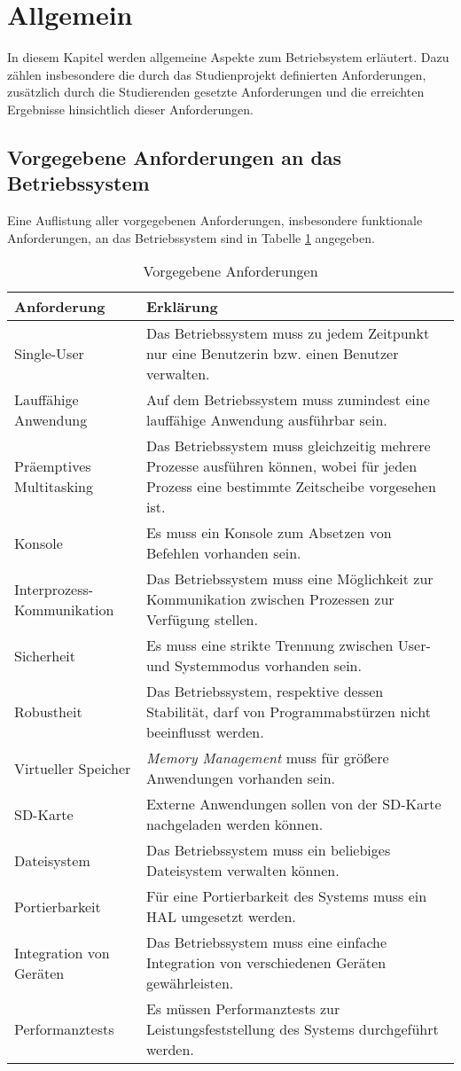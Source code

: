 \section{Allgemein}
In diesem Kapitel werden allgemeine Aspekte zum Betriebsystem erläutert. Dazu zählen insbesondere die durch das Studienprojekt definierten Anforderungen, zusätzlich durch die Studierenden gesetzte Anforderungen und die erreichten Ergebnisse hinsichtlich dieser Anforderungen.

\subsection{Vorgegebene Anforderungen an das Betriebssystem}
Eine Auflistung aller vorgegebenen Anforderungen, insbesondere funktionale Anforderungen, an das Betriebssystem sind in Tabelle \ref{table:Prescribed-Requirements} angegeben.

\begin{table}[H]
\begin{tabular}{ p{5cm}| p{9cm} }
  \textbf{Anforderung} & \textbf{Erklärung} \\ 
  \hline
  Single-User & Das Betriebssystem muss zu jedem Zeitpunkt nur eine Benutzerin bzw. einen Benutzer verwalten. \\
  Lauffähige Anwendung & Auf dem Betriebssystem muss zumindest eine lauffähige Anwendung ausführbar sein. \\
  Präemptives Multitasking & Das Betriebssystem muss gleichzeitig mehrere Prozesse ausführen können, wobei für jeden Prozess eine bestimmte Zeitscheibe vorgesehen ist.\\
  Konsole & Es muss ein Konsole zum Absetzen von Befehlen vorhanden sein. \\
  Interprozess-Kommunikation & Das Betriebssystem muss eine Möglichkeit zur Kommunikation zwischen Prozessen zur Verfügung stellen. \\
  Sicherheit & Es muss eine strikte Trennung zwischen User- und Systemmodus vorhanden sein. \\
  Robustheit & Das Betriebssystem, respektive dessen Stabilität, darf von Programmabstürzen nicht beeinflusst werden. \\
  Virtueller Speicher & \textit{Memory Management} muss für größere Anwendungen vorhanden sein. \\
  SD-Karte & Externe Anwendungen sollen von der SD-Karte nachgeladen werden können. \\
  Dateisystem & Das Betriebssystem muss ein beliebiges Dateisystem verwalten können.\\
  Portierbarkeit & Für eine Portierbarkeit des Systems muss ein \ac{HAL} umgesetzt werden. \\
  Integration von Geräten & Das Betriebssystem muss eine einfache Integration von verschiedenen Geräten gewährleisten. \\
  Performanztests & Es müssen Performanztests zur Leistungsfeststellung des Systems durchgeführt werden. \\  
 \end{tabular}
 \caption{Vorgegebene Anforderungen}
 \label{table:Prescribed-Requirements}
\end{table}

